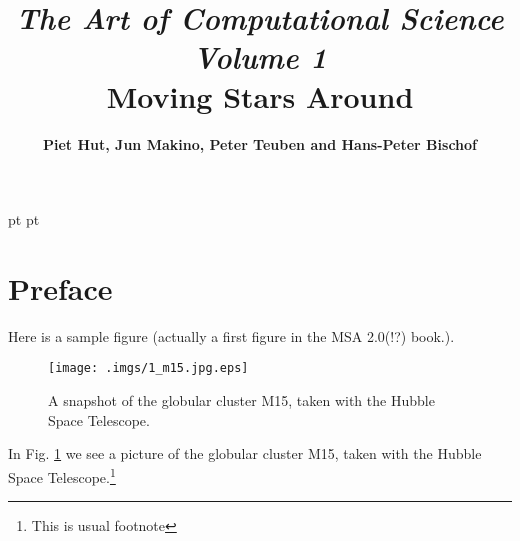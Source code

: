 \documentclass{book}
\begin{document}
 pt
 pt



\title{{\sl \huge The Art of Computational Science}\\
\bigskip
{\sl Volume 1}\\
\bigskip
\bigskip
\bigskip
\bigskip
\bigskip
\bf Moving Stars Around
\bigskip
}
\author{\bf Piet Hut, Jun Makino, Peter Teuben and Hans-Peter Bischof}


\maketitle
\thispagestyle{empty}


\newpage\tableofcontents\newpage


\chapter*{  Preface}
\label{sect:1}

Here is a sample figure (actually a first figure in the MSA 2.0(!?)
book.).

\begin{figure}
\begin{minipage}{10cm}
\renewcommand{\thempfootnote}{\arabic{mpfootnote}}
\begin{center}
    \texttt{[image: .imgs/1\_m15.jpg.eps]}
\caption{ A snapshot of the globular cluster M15, taken with the Hubble Space
 Telescope.
\protect\footnotemark[2]
}
\label{m15}
\end{center}

\end{minipage}
\end{figure}

In Fig. \ref{m15} we see a
picture of the globular cluster M15, taken with the Hubble Space
Telescope.\footnote{This is usual footnote}
\end{document}
